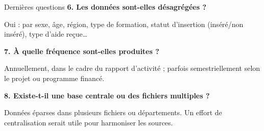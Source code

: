 \documentclass{beamer}
\begin{document}
\begin{frame}{Dernières questions}
\pause
\textbf{6. Les données sont-elles désagrégées ?}
\begin{tcolorbox}[colback=blue!5!white,colframe=blue!75!black,title=Exemple de réponse]
Oui : par sexe, âge, région, type de formation, statut d’insertion (inséré/non inséré), type d’aide reçue…
\end{tcolorbox}

\pause
\textbf{7. À quelle fréquence sont-elles produites ?}
\begin{tcolorbox}[colback=blue!5!white,colframe=blue!75!black,title=Exemple de réponse]
Annuellement, dans le cadre du rapport d’activité ; parfois semestriellement selon le projet ou programme financé.
\end{tcolorbox}

\pause
\textbf{8. Existe-t-il une base centrale ou des fichiers multiples ?}
\begin{tcolorbox}[colback=blue!5!white,colframe=blue!75!black,title=Exemple de réponse]
Données éparses dans plusieurs fichiers ou départements. Un effort de centralisation serait utile pour harmoniser les sources.
\end{tcolorbox}
\end{frame}
\end{document}
